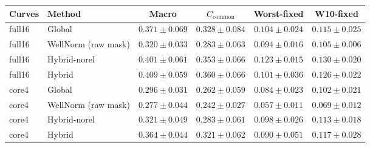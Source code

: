 \begin{tabular}{@{}llcccc@{}}
\toprule
Curves & Method & Macro & $C_{\mathrm{common}}$ & Worst-fixed & W10-fixed \\
\midrule
full16 & Global & $0.371\pm0.069$ & $0.328\pm0.084$ & $0.104\pm0.024$ & $0.115\pm0.025$ \\
full16 & WellNorm (raw mask) & $0.320\pm0.033$ & $0.283\pm0.063$ & $0.094\pm0.016$ & $0.105\pm0.006$ \\
full16 & Hybrid-norel & $0.401\pm0.061$ & $0.353\pm0.066$ & $0.123\pm0.015$ & $0.130\pm0.020$ \\
full16 & Hybrid & $0.409\pm0.059$ & $0.360\pm0.066$ & $0.101\pm0.036$ & $0.126\pm0.022$ \\
core4 & Global & $0.296\pm0.031$ & $0.262\pm0.059$ & $0.084\pm0.023$ & $0.102\pm0.021$ \\
core4 & WellNorm (raw mask) & $0.277\pm0.044$ & $0.242\pm0.027$ & $0.057\pm0.011$ & $0.069\pm0.012$ \\
core4 & Hybrid-norel & $0.321\pm0.049$ & $0.283\pm0.061$ & $0.098\pm0.026$ & $0.113\pm0.018$ \\
core4 & Hybrid & $0.364\pm0.044$ & $0.321\pm0.062$ & $0.090\pm0.051$ & $0.117\pm0.028$ \\
\bottomrule
\end{tabular}
